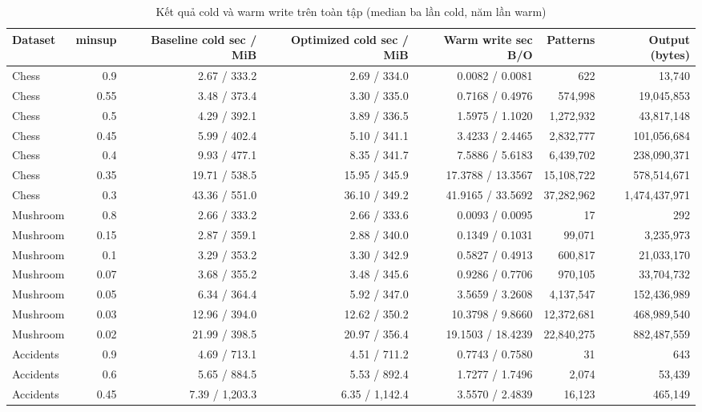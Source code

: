 \begin{table}[!t]
\centering\footnotesize
\caption{Kết quả cold và warm write trên toàn tập (median ba lần cold, năm lần
warm)}
\label{tab:c2-III}
\setlength{\tabcolsep}{4pt}
\begin{tabular}{lrrrrrr}
\hline
\textbf{Dataset} & \textbf{minsup} & \textbf{Baseline cold sec / MiB} & \textbf{Optimized cold sec / MiB} & \textbf{Warm write sec B/O} & \textbf{Patterns} & \textbf{Output (bytes)} \\ \hline
Chess & 0.9 & 2.67 / 333.2 & 2.69 / 334.0 & 0.0082 / 0.0081 & 622 & 13,740 \\
Chess & 0.55 & 3.48 / 373.4 & 3.30 / 335.0 & 0.7168 / 0.4976 & 574,998 & 19,045,853 \\
Chess & 0.5 & 4.29 / 392.1 & 3.89 / 336.5 & 1.5975 / 1.1020 & 1,272,932 & 43,817,148 \\
Chess & 0.45 & 5.99 / 402.4 & 5.10 / 341.1 & 3.4233 / 2.4465 & 2,832,777 & 101,056,684 \\
Chess & 0.4 & 9.93 / 477.1 & 8.35 / 341.7 & 7.5886 / 5.6183 & 6,439,702 & 238,090,371 \\
Chess & 0.35 & 19.71 / 538.5 & 15.95 / 345.9 & 17.3788 / 13.3567 & 15,108,722 & 578,514,671 \\
Chess & 0.3 & 43.36 / 551.0 & 36.10 / 349.2 & 41.9165 / 33.5692 & 37,282,962 & 1,474,437,971 \\
Mushroom & 0.8 & 2.66 / 333.2 & 2.66 / 333.6 & 0.0093 / 0.0095 & 17 & 292 \\
Mushroom & 0.15 & 2.87 / 359.1 & 2.88 / 340.0 & 0.1349 / 0.1031 & 99,071 & 3,235,973 \\
Mushroom & 0.1 & 3.29 / 353.2 & 3.30 / 342.9 & 0.5827 / 0.4913 & 600,817 & 21,033,170 \\
Mushroom & 0.07 & 3.68 / 355.2 & 3.48 / 345.6 & 0.9286 / 0.7706 & 970,105 & 33,704,732 \\
Mushroom & 0.05 & 6.34 / 364.4 & 5.92 / 347.0 & 3.5659 / 3.2608 & 4,137,547 & 152,436,989 \\
Mushroom & 0.03 & 12.96 / 394.0 & 12.62 / 350.2 & 10.3798 / 9.8660 & 12,372,681 & 468,989,540 \\
Mushroom & 0.02 & 21.99 / 398.5 & 20.97 / 356.4 & 19.1503 / 18.4239 & 22,840,275 & 882,487,559 \\
Accidents & 0.9 & 4.69 / 713.1 & 4.51 / 711.2 & 0.7743 / 0.7580 & 31 & 643 \\
Accidents & 0.6 & 5.65 / 884.5 & 5.53 / 892.4 & 1.7277 / 1.7496 & 2,074 & 53,439 \\
Accidents & 0.45 & 7.39 / 1,203.3 & 6.35 / 1,142.4 & 3.5570 / 2.4839 & 16,123 & 465,149 \\

\end{tabular}
\end{table}
